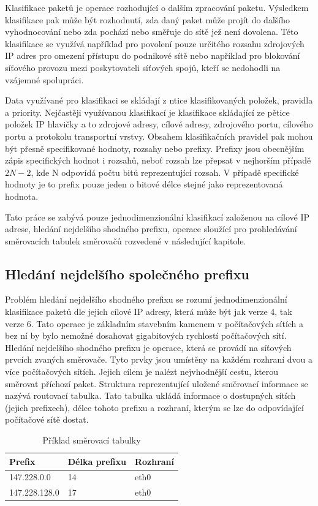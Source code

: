Klasifikace paketů je operace rozhodující o dalším zpracování paketu.
Výsledkem klasifikace pak může být rozhodnutí, zda daný paket může projít do
dalšího vyhodnocování nebo zda pochází nebo směřuje do sítě jež není dovolena.
Této klasifikace se využívá například pro povolení pouze určitého rozsahu zdrojových IP adres
pro omezení přístupu do podnikové sítě nebo například pro blokování síťového provozu
mezi poskytovateli síťových spojů, kteří se nedohodli na vzájemné spolupráci.

Data využívané pro klasifikaci se skládají z ntice klasifikovaných položek, pravidla a priority.
Nejčastěji využívanou klasifikací je klasifikace skládající ze pětice položek IP hlavičky
a to zdrojové adresy, cílové adresy, zdrojového portu, cílového portu a protokolu transportní vrstvy.
Obsahem klasifikačních pravidel pak mohou být přesně specifikované hodnoty, rozsahy nebo prefixy.
Prefixy jsou obecnějším zápis specifických hodnot i rozsahů, neboť rozsah lze přepsat v nejhorším
případě $2N - 2$, kde N odpovídá počtu bitů reprezentující rozsah. V případě specifické hodnoty
je to prefix pouze jeden o bitové délce stejné jako reprezentovaná hodnota.

Tato práce se zabývá pouze jednodimenzionální klasifikací založenou na cílové IP adrese, hledání
nejdelšího shodného prefixu, operace sloužící pro prohledávání směrovacích tabulek směrovačů
rozvedené v následující kapitole.

\subsection{Hledání nejdelšího společného prefixu} %
Problém hledání nejdelšího shodného prefixu se rozumí jednodimenzionální klasifikace paketů dle
jejich cílové IP adresy, která může být jak verze 4, tak verze 6.
Tato operace je základním stavebním kamenem v počítačových sítích a bez ní by bylo nemožné dosahovat
gigabitových rychlostí počítačových sítí. Hledání nejdelšího shodného prefixu je operace, která se provádí
na síťových prvcích zvaných směrovače. Tyto prvky jsou umístěny na každém rozhraní dvou a více
počítačových sítích. Jejich cílem je nalézt nejvhodnější cestu, kterou směrovat příchozí paket.
Struktura reprezentující uložené směrovací informace se nazývá routovací tabulka. Tato tabulka ukládá
informace o dostupných sítích (jejich prefixech), délce tohoto prefixu a rozhraní, kterým se lze
do odpovídající počítačové sítě dostat.

\begin{table}[!htbp]
	\center
    \begin{tabular}{|l|l|l|}
    \hline
    Prefix        & Délka prefixu & Rozhraní \\ \hline
    147.228.0.0   & 14            & eth0       \\ \hline
    147.228.128.0 & 17            & eth0       \\ \hline
    \end{tabular}
    \caption{Příklad směrovací tabulky}
\end{table}

